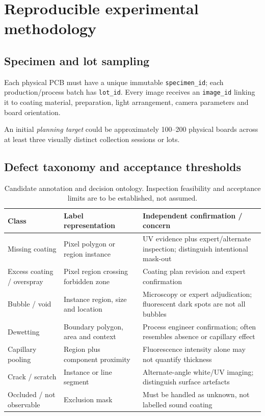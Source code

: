 \section{Reproducible experimental methodology}
\subsection{Specimen and lot sampling}
Each physical PCB must have a unique immutable \texttt{specimen\_id}; each production/process batch has \texttt{lot\_id}. Every image receives an \texttt{image\_id} linking it to coating material, preparation, light arrangement, camera parameters and board orientation.

An initial \emph{planning target} could be approximately 100--200 physical boards across at least three visually distinct collection sessions or lots.

\subsection{Defect taxonomy and acceptance thresholds}
\begin{table}[htbp]\centering\footnotesize
\caption{Candidate annotation and decision ontology. Inspection feasibility and acceptance limits are to be established, not assumed.}\label{tab:ontology}
\begin{tabularx}{\textwidth}{p{30mm}p{25mm}X}\toprule
Class & Label representation & Independent confirmation / concern\\\midrule
Missing coating & Pixel polygon or region instance & UV evidence plus expert/alternate inspection; distinguish intentional mask-out\\
Excess coating / overspray & Pixel region crossing forbidden zone & Coating plan revision and expert confirmation\\
Bubble / void & Instance region, size and location & Microscopy or expert adjudication; fluorescent dark spots are not all bubbles\\
Dewetting & Boundary polygon, area and context & Process engineer confirmation; often resembles absence or capillary effect\\
Capillary pooling & Region plus component proximity & Fluorescence intensity alone may not quantify thickness\\
Crack / scratch & Instance or line segment & Alternate-angle white/UV imaging; distinguish surface artefacts\\
Occluded / not observable & Exclusion mask & Must be handled as unknown, not labelled sound coating\\
\bottomrule\end{tabularx}
\end{table}

